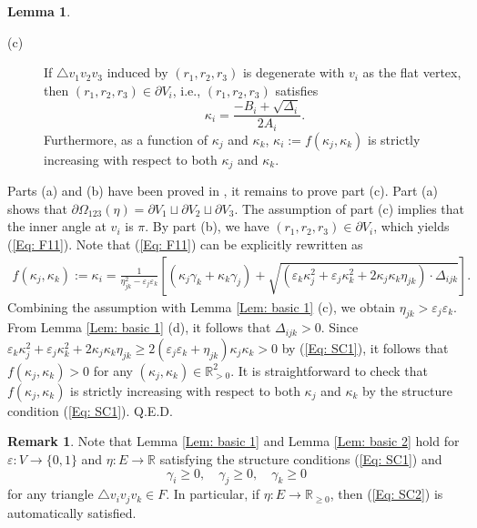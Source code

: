 \documentclass[12pt]{amsart}
\theoremstyle{definition}
\newtheorem{lemma}[theorem]{Lemma}
\newtheorem{remark}[theorem]{Remark}
\def\qed{\hfill{Q.E.D.}\smallskip}
\begin{document}
\begin{lemma}
\begin{description}
\item[(c)]
If $\triangle v_1v_2v_3$ induced by $(r_1, r_2, r_3)$ is degenerate with $v_i$ as the flat vertex,
then $(r_1, r_2, r_3) \in \partial V_i$, i.e.,
$(r_1, r_2, r_3)$ satisfies
\begin{equation}\label{Eq: F11}
\kappa_i = \frac{-B_i + \sqrt{\Delta_i}}{2A_i}.
\end{equation}
Furthermore, as a function of $\kappa_j$ and $\kappa_k$, $\kappa_i := f(\kappa_j, \kappa_k)$ is strictly increasing with respect to both $\kappa_j$ and $\kappa_k$.
\end{description}
\end{lemma}
\proof
Parts (a) and (b) have been proved in \cite{Xu 1}, it remains to prove part (c). 
Part (a) shows that $\partial\Omega_{123}(\eta) = \partial V_1 \sqcup \partial V_2 \sqcup \partial V_3$. 
The assumption of part (c) implies that the inner angle at $v_i$ is $\pi$. 
By part (b), we have $(r_1,r_2,r_3)\in\partial V_i$, 
which yields (\ref{Eq: F11}). 
Note that (\ref{Eq: F11}) can be explicitly rewritten as
\begin{gather*}
f(\kappa_j, \kappa_k) := \kappa_i
= \frac{1}{\eta^2_{jk} - \varepsilon_j \varepsilon_k}
\left[(\kappa_j \gamma_{k} + \kappa_{k} \gamma_j) +
\sqrt{(\varepsilon_k \kappa_j^2
+ \varepsilon_j \kappa_{k}^2 + 2\kappa_j \kappa_{k} \eta_{jk})
\cdot \Delta_{ijk}}\right].
\end{gather*}
Combining the assumption with Lemma \ref{Lem: basic 1} (c), we obtain $\eta_{jk}>\varepsilon_j\varepsilon_k$. 
From Lemma \ref{Lem: basic 1} (d), it follows that $\Delta_{ijk}>0$. 
Since $\varepsilon_k\kappa_j^2 +\varepsilon_j\kappa_{k}^2+2\kappa_j\kappa_{k}\eta_{jk} \geq2(\varepsilon_j\varepsilon_k+\eta_{jk})\kappa_j\kappa_{k} >0$ by (\ref{Eq: SC1}), it follows that $f(\kappa_j,\kappa_k)>0$ for any $(\kappa_j,\kappa_k)\in\mathbb{R}^2_{>0}$. 
It is straightforward to check that $f(\kappa_j,\kappa_k)$ is strictly increasing with respect to both $\kappa_j$ and $\kappa_k$ by the structure condition  (\ref{Eq: SC1}).
\qed

\begin{remark}
Note that Lemma \ref{Lem: basic 1} and Lemma \ref{Lem: basic 2} hold for $\varepsilon: V\rightarrow \{0,1\}$ and $\eta: E\rightarrow \mathbb{R}$ satisfying the structure conditions (\ref{Eq: SC1}) and
\begin{equation}\label{Eq: SC2}
\gamma_{i}\geq 0, \quad \gamma_j\geq 0, \quad \gamma_k\geq 0
\end{equation}
for any triangle $\triangle v_iv_jv_k\in F$. 
In particular, if $\eta: E\rightarrow \mathbb{R}_{\geq 0}$, then (\ref{Eq: SC2}) is automatically satisfied.
\end{remark}
\end{document}
